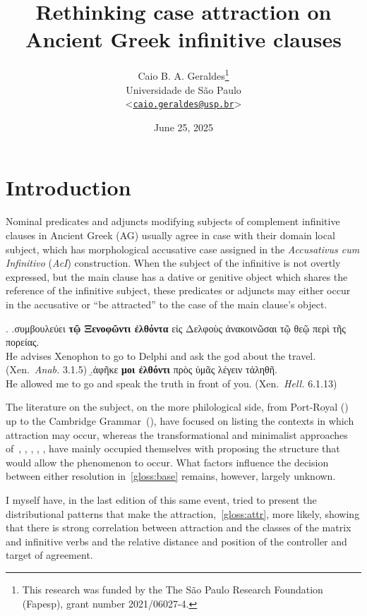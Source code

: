 \documentclass[a4paper, 12pt, article]{memoir}
\title{Rethinking case attraction on Ancient Greek infinitive clauses}
\author{
  Caio B. A. Geraldes\thanks{
		This research was funded by the 
	 The São Paulo Research Foundation (Fapesp), grant number 2021/06027-4.}
	\\\smallskip
	Universidade de São Paulo
	\\\smallskip
	<\href{mailto:caio.geraldes@usp.br}{\texttt{caio.geraldes@usp.br}}>
}
\date{June 25, 2025}
\begin{document}
\maketitle

\chapter{Introduction} %

Nominal predicates and adjuncts modifying subjects of complement infinitive
clauses in Ancient Greek (AG) usually agree in case with their domain local
subject, which has morphological accusative case assigned in the
\emph{Accusativus cum Infinitivo} (\emph{AcI}) construction.
When the subject of the infinitive is not overtly expressed, but the main clause
has a dative or genitive object which shares the reference of the infinitive
subject, these predicates or adjuncts may either occur in the accusative or ``be
attracted'' to the case of the main clause's object.

\ex.\label{gloss:base}
\a.\label{gloss:noattr}συμβουλεύει \textbf{τῷ Ξενοφῶντι ἐλθόντα} {εἰς Δελφοὺς}
ἀνακοινῶσαι {τῷ θεῷ} {περὶ τῆς πορείας}.\\
He advises Xenophon to go to Delphi and ask the god about the travel.
(Xen.\ \emph{Anab.} 3.1.5)
\b.\label{gloss:attr}ἀφῆκε \textbf{μοι ἐλθόντι} {πρὸς ὑμᾶς} λέγειν τἀληθῆ.\\
He allowed me to go and speak the truth in front of you.
(Xen.\ \emph{Hell.} 6.1.13)


The literature on the subject, on the more philological side, from
Port\hyp{}Royal (\cite{Lancelot1658,Lancelot1709}) up to the Cambridge
Grammar~(\cite{Boas2019}), have focused on listing the contexts in which
attraction may occur, whereas the transformational and minimalist approaches
of~\textcite{Lakoff1970}, \textcite{Andrews1971}, \textcite{Quicoli1982},
\textcite{Spyropoulos2005}, \textcite{Tantalou2003},
\textcite{Sevdali2006,Sevdali2013} have mainly occupied themselves with
proposing the structure that would allow the phenomenon to occur.
What factors influence the decision between either resolution
in~\ref{gloss:base} remains, however, largely unknown.

I myself have, in the last edition of this
same event, tried to present the distributional patterns that make the
attraction,~\ref{gloss:attr}, more likely, showing that there is strong
correlation between attraction and the classes of the matrix and infinitive
verbs and the relative distance and position of the controller and target of
agreement.
\end{document}
